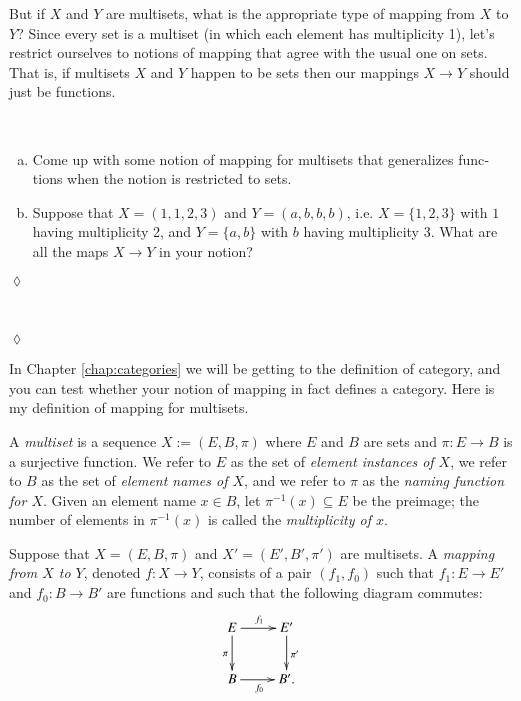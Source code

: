 \documentclass[a4paper]{book}
\def\to{\rightarrow}
\def\taking{\colon}
\def\ss{\subseteq}
\def\m1{{-1}}
\theoremstyle{myth}
\newtheorem{excENG}[envENG]{\begin{english}Exercise\end{english}}
\newtheorem{definitionENG}[envENG]{\begin{english}Definition\end{english}}
\newenvironment{exerciseENG}{\begin{excENG}}{\hspace*{\fill}$\lozenge$\end{excENG}}
\newtheorem{excRUS}[envRUS]{\begin{russian}Упражнение\end{russian}}
\newenvironment{exerciseRUS}{\begin{excRUS}}{\hspace*{\fill}$\lozenge$\end{excRUS}}
\def\sexc{\begin{enumerate}[a.)]\setlength{\itemsep}{.1cm}\setlength{\parskip}{.1cm}\item}
\def\next{\item}
\def\endsexc{\end{enumerate}}
\begin{document}
\begin{english}
\begin{russian} \end{russian}

But if $X$ and $Y$ are multisets, what is the appropriate type of mapping from $X$ to $Y$? Since every set is a multiset (in which each element has multiplicity 1), let's restrict ourselves to notions of mapping that agree with the usual one on sets. That is, if multisets $X$ and $Y$ happen to be sets then our mappings $X\to Y$ should just be functions.

\begin{russian} \end{russian}

\begin{exerciseENG}\label{exc:multiset 1}~
\sexc Come up with some notion of mapping for multisets that generalizes functions when the notion is restricted to sets. 
\next Suppose that $X=(1,1,2,3)$ and $Y=(a,b,b,b)$, i.e. $X=\{1,2,3\}$ with $1$ having multiplicity 2, and $Y=\{a,b\}$ with $b$ having multiplicity 3. What are all the maps $X\to Y$ in your notion?
\endsexc
\end{exerciseENG}

\begin{exerciseRUS}\label{exc:multiset 1}~
\begin{russian} \end{russian}
\end{exerciseRUS}

In Chapter \ref{chap:categories} we will be getting to the definition of category, and you can test whether your notion of mapping in fact defines a category. Here is my definition of mapping for multisets.

\begin{russian} \end{russian}

\begin{definitionENG}\label{def:multiset}
A {\em multiset} is a sequence $X:=(E,B,\pi)$ where $E$ and $B$ are sets and $\pi\taking E\to B$ is a surjective function. We refer to $E$ as the set of {\em element instances of $X$}, we refer to $B$ as the set of {\em element names of $X$}, and we refer to $\pi$ as the {\em naming function for $X$}. Given an element name $x\in B$, let $\pi^\m1(x)\ss E$ be the preimage; the number of elements in $\pi^\m1(x)$ is called the {\em multiplicity of $x$}.

Suppose that $X=(E,B,\pi)$ and $X'=(E',B',\pi')$ are multisets. A {\em mapping from $X$ to $Y$}, denoted $f\taking X\to Y$, consists of a pair $(f_1,f_0)$ such that $f_1\taking E\to E'$ and $f_0\taking B\to B'$ are functions and such that the following diagram commutes:
\begin{align}\label{dia:multiset map}
\xymatrix{E\ar[r]^{f_1}\ar[d]_{\pi}&E'\ar[d]^{\pi'}\\B\ar[r]_{f_0}&B'.}
\end{align}
\end{definitionENG}


\end{english}
\end{document}
